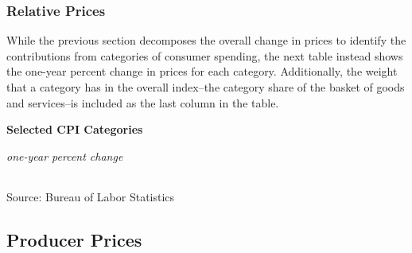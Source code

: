 \documentclass{report}
\begin{document}
{{\begin{minipage}{0.76\textwidth}
\subsubsection*{\color{black!70} \seriffont Relative Prices}
\small While the previous section decomposes the overall change in prices to identify the contributions from categories of consumer spending, the next table instead shows the one-year percent change in prices for each category. Additionally, the weight that a category has in the overall index--the category share of the basket of goods and services--is included as the last column in the table.
\vspace{1.5mm}

\normalsize \textbf{Selected CPI Categories}\\
\footnotesize{\textit{one-year percent change}\\
\hspace*{-3mm}  \setlength{\tabcolsep}{3.1pt} \color{black!90}
		{\renewcommand{\arraystretch}{1.54}
\begin{tabular}{p{41mm} R{7.0mm} R{7.0mm} R{7.0mm} R{7.0mm}
		 		 R{7.0mm} R{7.0mm} R{7.0mm} R{10mm}} %
			  \hline
		\end{tabular}}}
\vspace{-2mm}		
		
\footnotesize{Source: Bureau of Labor Statistics}
\vspace{3.5mm}

\small 
\end{minipage}
\newpage
\subsection*{\color{black!70} \seriffont Producer Prices}
\vspace{1mm}

}}
\end{document}
